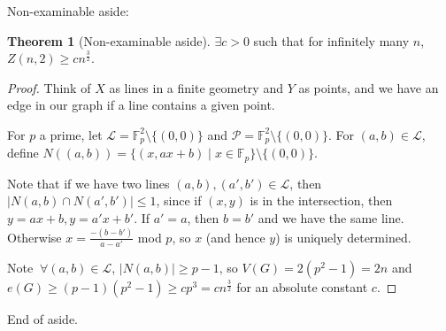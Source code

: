 \documentclass{article}
\theoremstyle{definition}
\newtheorem{theorem}{Theorem}[section]
\begin{document}
Non-examinable aside:
\begin{theorem}[Non-examinable aside]
    $\exists c>0$ such that for infinitely many $n$, $Z(n,2)\ge cn^{\frac{3}{2}}$. 
\end{theorem}
\begin{proof}
    Think of $X$ as lines in a finite geometry and $Y$ as points, and we have an edge in our graph if a line contains a given point.

    For $p$ a prime, let $\mathcal{L}= \mathbb{F}_p^2 \setminus \{(0,0)\}$ and $\mathcal{P}=\mathbb{F}_p^2 \setminus \{(0,0)\}$. For $(a,b) \in \mathcal{L}$, define $N((a,b)) = \{(x,ax+b) \mid x \in \mathbb{F}_p\} \setminus \{(0,0)\}$.

    \vspace{1mm}
    
    Note that if we have two lines $(a,b), (a',b') \in \mathcal{L}$, then $|N(a,b) \cap N(a',b')|\le 1$, since if $(x,y)$ is in the intersection, then $y=ax+b,y=a'x+b'$. If $a'=a$, then $b=b'$ and we have the same line. Otherwise $x = \frac{-(b-b')}{a-a'}$ mod $p$, so $x$ (and hence $y$) is uniquely determined.
    \vspace{1mm}
    
    Note $~\forall (a,b) \in \mathcal{L}$, $|N(a,b)|\ge p-1$, so $V(G)=2(p^2-1)=2n$ and $e(G)\ge (p-1)(p^2-1) \ge c p^3 = cn^{\frac{3}{2}}$ for an absolute constant $c$.
\end{proof}
End of aside.
\end{document}
